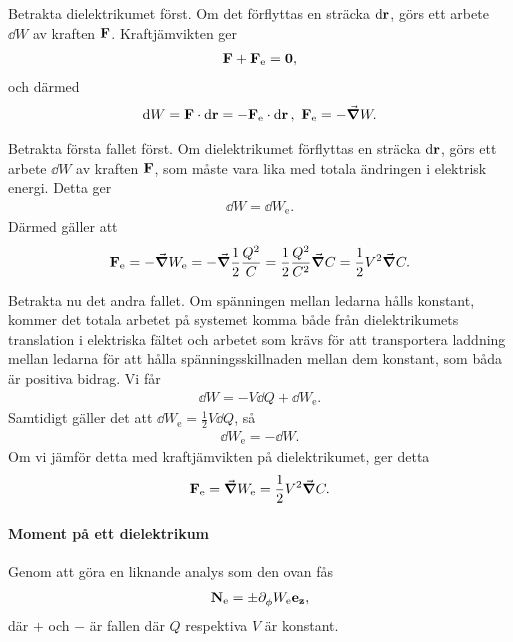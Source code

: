 Betrakta dielektrikumet först. Om det förflyttas en sträcka $\dd{\vb{r}}$, görs ett arbete $\dd{W}$ av kraften $\vb{F}$. Kraftjämvikten ger
\begin{align*}
	\vb{F} + \vb{F}_{\text{e}} = \vb{0},
\end{align*}
och därmed
\begin{align*}
	\dd{W} = \vb{F}\cdot\dd{\vb{r}} = -\vb{F}_{\text{e}}\cdot\dd{\vb{r}},\ \vb{F}_{\text{e}} = -\grad{W}.
\end{align*}

Betrakta första fallet först. Om dielektrikumet förflyttas en sträcka $\dd{\vb{r}}$, görs ett arbete $\dd{W}$ av kraften $\vb{F}$, som måste vara lika med totala ändringen i elektrisk energi. Detta ger
\begin{align*}
	\dd{W} = \dd{W_{\text{e}}}.
\end{align*}
Därmed gäller att
\begin{align*}
	\vb{F}_{\text{e}} = -\grad{W_{\text{e}}} = -\grad{\frac{1}{2}\frac{Q^{2}}{C}} = \frac{1}{2}\frac{Q^{2}}{C^{2}}\grad{C} = \frac{1}{2}V^{2}\grad{C}.
\end{align*}

Betrakta nu det andra fallet. Om spänningen mellan ledarna hålls konstant, kommer det totala arbetet på systemet komma både från dielektrikumets translation i elektriska fältet och arbetet som krävs för att transportera laddning mellan ledarna för att hålla spänningsskillnaden mellan dem konstant, som båda är positiva bidrag. Vi får 
\begin{align*}
	\dd{W} = -V\dd{Q} + \dd{W_{\text{e}}}.
\end{align*}
Samtidigt gäller det att $\dd{W_{\text{e}}} = \frac{1}{2}V\dd{Q}$, så
\begin{align*}
	\dd{W_{\text{e}}} = -\dd{W}.
\end{align*}
Om vi jämför detta med kraftjämvikten på dielektrikumet, ger detta
\begin{align*}
	\vb{F}_{\text{e}} = \grad{W_{\text{e}}} = \frac{1}{2}V^{2}\grad{C}.
\end{align*}

\paragraph{Moment på ett dielektrikum}
Genom att göra en liknande analys som den ovan fås
\begin{align*}
	\vb{N}_{\text{e}} = \pm\partial_{\phi}^{}W_{\text{e}}\vb{e}_{\vb{z}},
\end{align*}
där $+$ och $-$ är fallen där $Q$ respektiva $V$ är konstant.